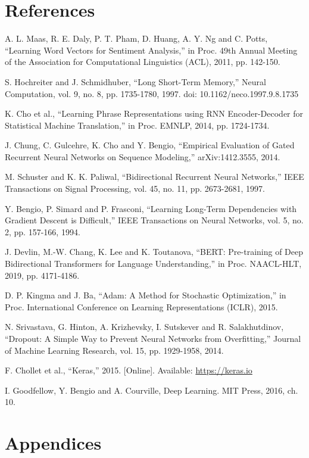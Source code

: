 \documentclass[12pt,a4paper,oneside]{report}
\begin{document}
\chapter*{References}
\begin{enumerate}[label={[\arabic*]},leftmargin=2.2em]
\item A. L. Maas, R. E. Daly, P. T. Pham, D. Huang, A. Y. Ng and C. Potts, ``Learning Word Vectors for Sentiment Analysis,'' in Proc. 49th Annual Meeting of the Association for Computational Linguistics (ACL), 2011, pp. 142-150.
\item S. Hochreiter and J. Schmidhuber, ``Long Short-Term Memory,'' Neural Computation, vol. 9, no. 8, pp. 1735-1780, 1997. doi: 10.1162/neco.1997.9.8.1735
\item K. Cho et al., ``Learning Phrase Representations using RNN Encoder-Decoder for Statistical Machine Translation,'' in Proc. EMNLP, 2014, pp. 1724-1734.
\item J. Chung, C. Gulcehre, K. Cho and Y. Bengio, ``Empirical Evaluation of Gated Recurrent Neural Networks on Sequence Modeling,'' arXiv:1412.3555, 2014.
\item M. Schuster and K. K. Paliwal, ``Bidirectional Recurrent Neural Networks,'' IEEE Transactions on Signal Processing, vol. 45, no. 11, pp. 2673-2681, 1997.
\item Y. Bengio, P. Simard and P. Frasconi, ``Learning Long-Term Dependencies with Gradient Descent is Difficult,'' IEEE Transactions on Neural Networks, vol. 5, no. 2, pp. 157-166, 1994.
\item J. Devlin, M.-W. Chang, K. Lee and K. Toutanova, ``BERT: Pre-training of Deep Bidirectional Transformers for Language Understanding,'' in Proc. NAACL-HLT, 2019, pp. 4171-4186.
\item D. P. Kingma and J. Ba, ``Adam: A Method for Stochastic Optimization,'' in Proc. International Conference on Learning Representations (ICLR), 2015.
\item N. Srivastava, G. Hinton, A. Krizhevsky, I. Sutskever and R. Salakhutdinov, ``Dropout: A Simple Way to Prevent Neural Networks from Overfitting,'' Journal of Machine Learning Research, vol. 15, pp. 1929-1958, 2014.
\item F. Chollet et al., ``Keras,'' 2015. [Online]. Available: \url{https://keras.io}
\item I. Goodfellow, Y. Bengio and A. Courville, Deep Learning. MIT Press, 2016, ch. 10.
\end{enumerate}
\chapter*{Appendices}
\end{document}
